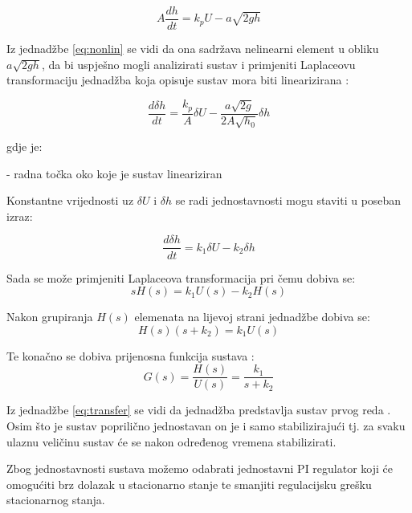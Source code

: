 \begin{equation}
    A\frac{dh}{dt} = k_p U - a \sqrt{2gh}
\label{eq:nonlin}
\end{equation}

Iz jednadžbe \ref{eq:nonlin} se vidi da ona sadržava nelinearni element u obliku
$a \sqrt{2gh}$, da bi uspješno mogli analizirati sustav i primjeniti Laplaceovu
transformaciju jednadžba koja opisuje sustav mora biti linearizirana
\cite[88-97]{control}:

\begin{equation} \frac{d\delta h}{dt} = \frac{k_p}{A} \delta U -
                 \frac{a \sqrt{2g}}{2 A \sqrt{h_0}} \delta h \end{equation}

gdje je:
\begin{description}[labelindent=2cm]
        \item[$h_0$] - radna točka oko koje je sustav lineariziran
\end{description}

Konstantne vrijednosti uz $\delta U$ i $\delta h$ se radi jednostavnosti mogu
staviti u poseban izraz:

\begin{equation}
    \frac{d\delta h}{dt} = k_1 \delta U - k_2 \delta h
\end{equation}

Sada se može primjeniti Laplaceova transformacija \cite[35-44]{control} pri čemu
dobiva se:
\begin{equation} s H(s) = k_1 U(s) - k_2 H(s) \end{equation}

Nakon grupiranja $H(s)$ elemenata na lijevoj strani jednadžbe dobiva se:
\begin{equation} H(s)(s+k_2) = k_1 U(s) \end{equation}

Te konačno se dobiva prijenosna funkcija sustava \cite[45]{control}:
\begin{equation}
    G(s) = \frac{H(s)}{U(s)} = \frac{k_1}{s+k_2}
\label{eq:transfer}
\end{equation}

Iz jednadžbe \ref{eq:transfer} se vidi da jednadžba predstavlja sustav prvog
reda \cite[166]{control}. Osim što je sustav poprilično jednostavan on je i samo
stabilizirajući \cite{control_guru} tj. za svaku ulaznu veličinu sustav će se
nakon određenog vremena stabilizirati.

Zbog jednostavnosti sustava možemo odabrati jednostavni PI regulator koji će
omogućiti brz dolazak u stacionarno stanje te smanjiti regulacijsku grešku
stacionarnog stanja.

